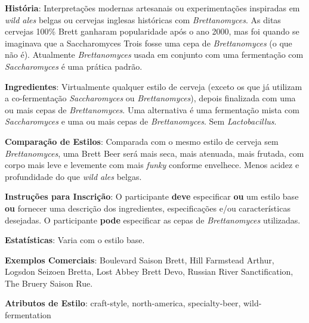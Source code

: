 \textbf{História}: Interpretações modernas artesanais ou experimentações inspiradas em \textit{wild ales} belgas ou cervejas inglesas históricas com \textit{Brettanomyces}. As ditas cervejas 100\% Brett ganharam popularidade após o ano 2000, mas foi quando se imaginava que a Saccharomyces Trois fosse uma cepa de \textit{Brettanomyces} (o que não é). Atualmente \textit{Brettanomyces} usada em conjunto com uma fermentação com \textit{Saccharomyces} é uma prática padrão.

\textbf{Ingredientes}: Virtualmente qualquer estilo de cerveja (exceto os que já utilizam a co-fermentação \textit{Saccharomyces} ou \textit{Brettanomyces}), depois finalizada com uma ou mais cepas de \textit{Brettanomyces}. Uma alternativa é uma fermentação mista com \textit{Saccharomyces} e uma ou mais cepas de \textit{Brettanomyces}. Sem \textit{Lactobacillus}.

\textbf{Comparação de Estilos}: Comparada com o mesmo estilo de cerveja sem \textit{Brettanomyces}, uma Brett Beer será mais seca, mais atenuada, mais frutada, com corpo mais leve e levemente com mais \textit{funky} conforme envelhece. Menos acidez e profundidade do que \textit{wild ales} belgas.

\textbf{Instruções para Inscrição}: O participante \textbf{deve} especificar \textbf{ou} um estilo base \textbf{ou} fornecer uma descrição dos ingredientes, especificações e/ou características desejadas. O participante \textbf{pode} especificar as cepas de \textit{Brettanomyces} utilizadas.

\textbf{Estatísticas}: Varia com o estilo base.

\textbf{Exemplos Comerciais}: Boulevard Saison Brett, Hill Farmstead Arthur, Logsdon Seizoen Bretta, Lost Abbey Brett Devo, Russian River Sanctification, The Bruery Saison Rue.

\textbf{Atributos de Estilo}: craft-style, north-america, specialty-beer, wild-fermentation
